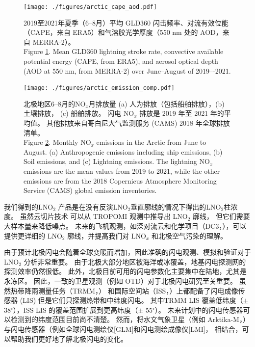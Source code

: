 \begin{figure}[!htbp]
\centering
\texttt{[image: ./figures/arctic\_cape\_aod.pdf]}
\caption{
2019至2021年夏季（6--8月）平均 GLD360 闪击频率、对流有效位能（CAPE，来自 ERA5）和气溶胶光学厚度（550 nm 处的 AOD，来自 MERRA-2）。\\
Figure \ref{fig:arctic_cape_aod}.
Mean GLD360 lightning stroke rate, convective available potential energy (CAPE, from ERA5), and aerosol optical depth (AOD at 550 nm, from MERRA-2) over June--August of 2019–-2021.
}
\label{fig:arctic_cape_aod}
\end{figure}


\begin{figure}[!htbp]
\centering
\texttt{[image: ./figures/arctic\_emission\_comp.pdf]}
\caption{
北极地区6--8月的NO$_x$月排放量
(a) 人为排放（包括船舶排放），(b) 土壤排放，
(c) 船舶排放。
闪电 NO$_x$ 排放是 2019 年至 2021 年的平均值。
其他排放来自哥白尼大气监测服务 (CAMS) 2018 年全球排放清单。\\
Figure \ref{fig:arctic_emission_comp}. Monthly NO$_x$ emissions in the Arctic from June to August.
(a) Anthropogenic emissions including ship emissions, (b) Soil emissions, and (c) Lightning emissions.
The lightning NO$_x$ emissions are the mean values from 2019 to 2021, while the other emissions are from the 2018 Copernicus Atmosphere Monitoring Service (CAMS) global emission inventories.
}
\label{fig:arctic_emission_comp}
\end{figure}


我们得到的LNO$_2$ 产品是在没有反演LNO$_2$垂直廓线的情况下得出的LNO$_2$柱浓度。
虽然云切片技术 \citep{BelmonteRivas.2015,Marais.2021} 可以从 TROPOMI 观测中推导出 LNO$_2$ 廓线，
但它们需要大样本量来降低噪点。
未来的飞机观测，如深对流云和化学项目（DC3，\citet{Barth.2019}），可以提供更详细的 LNO$_2$ 廓线，并提高我们对 LNO$_x$ 和北极空气污染的理解\citep{Law.2007,Schmale.2018}。

由于预计北极闪电会随着全球变暖而增加，因此准确的闪电观测、模拟和验证对于 LNO$_2$ 分析非常重要。
由于北极大部分地区被海洋或冰覆盖，地基闪电探测网的探测效率仍然很低\citep{Vagasky.2022}。
此外，北极目前可用的闪电参数化主要集中在陆地，尤其是永冻区\citep{Chen.2021a}。
因此，一致的卫星观测（例如 OTD）对于北极闪电研究至关重要。
虽然热带降雨测量任务（TRMM，\citet{Cecil.2014}） 和国际空间站（ISS，\citet{Blakeslee.2020}）上都配备了闪电成像传感器 (LIS)
但是它们只探测热带和中纬度闪电。
其中TRMM LIS 覆盖低纬度（$\pm$ 38$^{\circ}$），ISS LIS 的覆盖范围扩展到更高纬度（$\pm$ 55$^{\circ}$）。
未来计划中的闪电传感器可以检测到的纬度范围目前尚不清楚。
然而，将水文气象卫星（例如 Arktika-M，\citet{Asmus.2021}） 与闪电传感器（例如全球闪电测绘仪[GLM]和闪电测绘成像仪[LMI]，\citet{Goodman.2013,Yang.2017} 相结合，可以帮助我们更好地了解北极闪电的变化。


